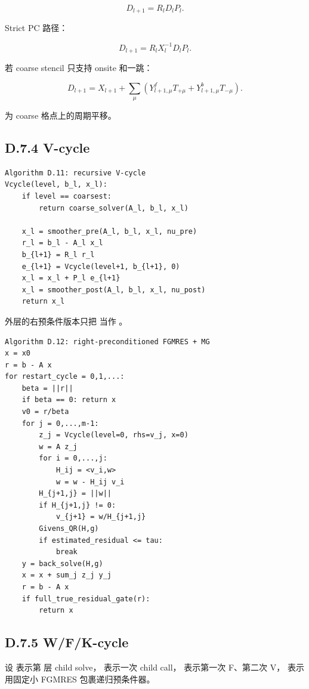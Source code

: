 \documentclass[UTF8,a4paper,10pt]{ctexart}
\DeclareRobustCommand{\pycode}[1]{\texorpdfstring{\texttt{\seqsplit{#1}}}{#1}}
\begin{document}
\begin{displaymath}
D_{l+1}=R_lD_lP_l.
\end{displaymath}

Strict PC 路径：

\begin{displaymath}
D_{l+1}=R_lX_l^{-1}D_lP_l.
\end{displaymath}

若 coarse stencil 只支持 onsite 和一跳：

\begin{displaymath}
D_{l+1} =X_{l+1} +\sum_\mu \left( Y_{l+1,\mu}^fT_{+\mu} +Y_{l+1,\mu}^bT_{-\mu} \right).
\end{displaymath}

\pycode{T\_mu} 为 coarse 格点上的周期平移。

\subsection{D.7.4 V-cycle}
\begin{Verbatim}[breaklines=true,breakanywhere=true,fontsize=\scriptsize]
Algorithm D.11: recursive V-cycle
Vcycle(level, b_l, x_l):
    if level == coarsest:
        return coarse_solver(A_l, b_l, x_l)

    x_l = smoother_pre(A_l, b_l, x_l, nu_pre)
    r_l = b_l - A_l x_l
    b_{l+1} = R_l r_l
    e_{l+1} = Vcycle(level+1, b_{l+1}, 0)
    x_l = x_l + P_l e_{l+1}
    x_l = smoother_post(A_l, b_l, x_l, nu_post)
    return x_l
\end{Verbatim}
外层的右预条件版本只把 \pycode{Vcycle} 当作 \pycode{M\textasciicircum{}-1}。

\begin{Verbatim}[breaklines=true,breakanywhere=true,fontsize=\scriptsize]
Algorithm D.12: right-preconditioned FGMRES + MG
x = x0
r = b - A x
for restart_cycle = 0,1,...:
    beta = ||r||
    if beta == 0: return x
    v0 = r/beta
    for j = 0,...,m-1:
        z_j = Vcycle(level=0, rhs=v_j, x=0)
        w = A z_j
        for i = 0,...,j:
            H_ij = <v_i,w>
            w = w - H_ij v_i
        H_{j+1,j} = ||w||
        if H_{j+1,j} != 0:
            v_{j+1} = w/H_{j+1,j}
        Givens_QR(H,g)
        if estimated_residual <= tau:
            break
    y = back_solve(H,g)
    x = x + sum_j z_j y_j
    r = b - A x
    if full_true_residual_gate(r):
        return x
\end{Verbatim}
\subsection{D.7.5 W/F/K-cycle}
设 \pycode{C\_l} 表示第 \pycode{l} 层 child solve，\pycode{V} 表示一次 child call，\pycode{F} 表示第一次 F、第二次 V，\pycode{K} 表示用固定小 FGMRES 包裹递归预条件器。
\end{document}
